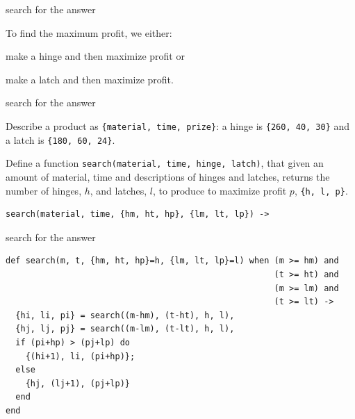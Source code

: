\begin{frame}{search for the answer}

To find the maximum profit, we either:

\pause \vspace{20pt}\hspace{40pt}
   make a hinge and then maximize profit or

\pause \vspace{20pt}\hspace{40pt}
   make a latch and then maximize profit.

\pause \vspace{20pt}\hspace{40pt}


\end{frame}


\begin{frame}[fragile]{search for the answer}

Describe a product as {\tt \{material, time, prize\}}: a hinge is {\tt \{260, 40, 30\}} and a latch is {\tt \{180, 60, 24\}}.

\pause\vspace{20pt}

Define a function {\tt search(material, time, hinge, latch)}, that
given an amount of material, time and descriptions of hinges and
latches, returns the number of hinges, $h$, and latches, $l$, to produce to
maximize profit $p$, {\tt \{h, l, p\}}.

\pause\vspace{20pt}

\begin{verbatim}
search(material, time, {hm, ht, hp}, {lm, lt, lp}) ->
\end{verbatim}
\end{frame}


\begin{frame}[fragile]{search for the answer}

\begin{verbatim}
def search(m, t, {hm, ht, hp}=h, {lm, lt, lp}=l) when (m >= hm) and 
                                                      (t >= ht) and 
                                                      (m >= lm) and 
                                                      (t >= lt) ->
  {hi, li, pi} = search((m-hm), (t-ht), h, l),
  {hj, lj, pj} = search((m-lm), (t-lt), h, l), 
  if (pi+hp) > (pj+lp) do
    {(hi+1), li, (pi+hp)};
  else
    {hj, (lj+1), (pj+lp)}
  end
end
\end{verbatim}
\end{frame}

